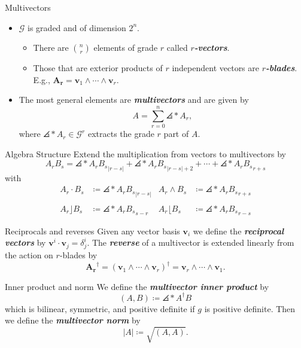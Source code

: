 \documentclass[aspectratio=169,handout]{beamer}
\newcommand\boldgreen[1]{\textcolor{lighter_csu_green}{\emph{\textbf{#1}}}}
\newcommand{\G}{\mathcal{G}}
\newcommand{\blade}[1]{\boldsymbol{#1}}
\DeclarePairedDelimiter\angles{\langle}{\rangle}
\newcommand{\proj}[2]{\angles*{#2}_{#1}}
\begin{document}
\begin{frame}{Multivectors}
\vfill
\begin{itemize}
    \pause
        \item $\G$ is graded and of dimension $2^n$.
    \begin{itemize}
    \pause
        \item There are ${n \choose r}$ elements of grade $r$ called \boldgreen{$r$-vectors}. 
        \item Those that are exterior products of $r$ independent vectors are \boldgreen{$r$-blades}. E.g., $\blade{A_r}=\blade{v}_1 \wedge \cdots \wedge\blade{v}_r$.
    \end{itemize}
    \pause
        \item The most general elements are \boldgreen{multivectors} and are given by
        \[
        A = \sum_{r=0}^n \proj{r}{A},
        \]
        where $\proj{r}{A}\in \G^r$ extracts the grade $r$ part of $A$.
\end{itemize}
\vfill
\end{frame}

\begin{frame}{Algebra Structure}
\vfill
Extend the multiplication from vectors to multivectors by
\[
A_r B_s = \proj{|r-s|}{A_r B_s} + \proj{|r-s|+2}{A_r B_s} + \cdots + \proj{r+s}{A_r B_s}
\]
with
\begin{align*}
A_r \cdot B_s &\coloneqq \proj{|r-s|}{A_r B_s}  & A_r \wedge B_s &\coloneqq \proj{r+s}{A_r B_s}\\
~\\
A_r \rfloor B_s &\coloneqq \proj{s-r}{A_r B_s}  & A_r \lfloor B_s &\coloneqq \proj{r-s}{A_r B_s}
\end{align*}
\vfill
\end{frame}

\begin{frame}{Reciprocals and reverses}
\vfill
Given any vector basis $\blade{v}_i$ we define the \boldgreen{reciprocal vectors} by $\blade{v}^i\cdot \blade{v}_j = \delta^i_j$.
\vspace{0.5cm}
The \boldgreen{reverse} of a multivector is extended linearly from the action on $r$-blades by
\[
\blade{A_r}^\dagger = (\blade{v}_1 \wedge \cdots \wedge\blade{v}_r)^\dagger = \blade{v}_r \wedge \cdots \wedge\blade{v}_1.
\]
\vfill
\end{frame}


\begin{frame}{Inner product and norm}
\vfill
We define the \boldgreen{multivector inner product} by
\[
(A,B) \coloneqq \proj{}{A^\dagger B}
\]
which is bilinear, symmetric, and positive definite if $g$ is positive definite. Then we define the \boldgreen{multivector norm} by
\[
|A| \coloneqq \sqrt{(A,A)}.
\]
\vfill
\end{frame}
\end{document}
